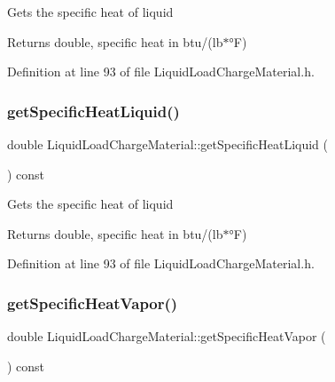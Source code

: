 Gets the specific heat of liquid \begin{DoxyReturn}{Returns}
double, specific heat in btu/(lb$\ast$°F) 
\end{DoxyReturn}


Definition at line 93 of file Liquid\+Load\+Charge\+Material.\+h.

\mbox{\label{class_liquid_load_charge_material_aa698f1f73dff91951139a4a50582963d}} 
\subsubsection{\texorpdfstring{get\+Specific\+Heat\+Liquid()}{getSpecificHeatLiquid()}\hspace{0.1cm}{\footnotesize\ttfamily [3/3]}}
{\footnotesize\ttfamily double Liquid\+Load\+Charge\+Material\+::get\+Specific\+Heat\+Liquid (\begin{DoxyParamCaption}{ }\end{DoxyParamCaption}) const\hspace{0.3cm}{\ttfamily [inline]}}

Gets the specific heat of liquid \begin{DoxyReturn}{Returns}
double, specific heat in btu/(lb$\ast$°F) 
\end{DoxyReturn}


Definition at line 93 of file Liquid\+Load\+Charge\+Material.\+h.

\mbox{\label{class_liquid_load_charge_material_ac4538f9722bf25465ec86586469a7b1e}} 
\subsubsection{\texorpdfstring{get\+Specific\+Heat\+Vapor()}{getSpecificHeatVapor()}\hspace{0.1cm}{\footnotesize\ttfamily [1/3]}}
{\footnotesize\ttfamily double Liquid\+Load\+Charge\+Material\+::get\+Specific\+Heat\+Vapor (\begin{DoxyParamCaption}{ }\end{DoxyParamCaption}) const\hspace{0.3cm}{\ttfamily [inline]}}

